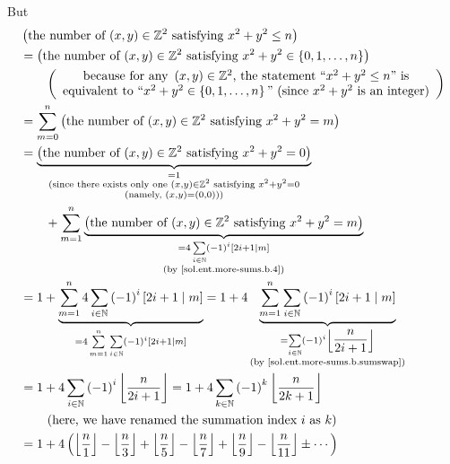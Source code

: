 \documentclass[paper=a4, fontsize=12pt]{scrartcl}%
\let\sumnonlimits\sum
\renewcommand{\sum}{\sumnonlimits\limits}
\theoremstyle{plainsl}
\theoremstyle{definition}
\theoremstyle{remark}
\begin{document}
But
\begin{align*}
&  \left(  \text{the number of $\left(  x,y\right)  \in\mathbb{Z}^{2}$
satisfying $x^{2}+y^{2}\leq n$}\right) \\
&  =\left(  \text{the number of $\left(  x,y\right)  \in\mathbb{Z}^{2}$
satisfying $x^{2}+y^{2}\in\left\{  0,1,\ldots,n\right\}  $}\right) \\
&  \qquad\left(
\begin{array}
[c]{c}%
\text{because for any }\left(  x,y\right)  \in\mathbb{Z}^{2}\text{, the
statement \textquotedblleft}x^{2}+y^{2}\leq n\text{\textquotedblright\ is}\\
\text{equivalent to \textquotedblleft}x^{2}+y^{2}\in\left\{  0,1,\ldots
,n\right\}  \text{\textquotedblright\ (since }x^{2}+y^{2}\text{ is an
integer)}%
\end{array}
\right) \\
&  =\sum_{m=0}^{n}\left(  \text{the number of $\left(  x,y\right)
\in\mathbb{Z}^{2}$ satisfying $x^{2}+y^{2}=m$}\right) \\
&  =\underbrace{\left(  \text{the number of $\left(  x,y\right)  \in
\mathbb{Z}^{2}$ satisfying $x^{2}+y^{2}=0$}\right)  }%
_{\substack{=1\\\text{(since there exists only one }\left(  x,y\right)
\in\mathbb{Z}^{2}\text{ satisfying }x^{2}+y^{2}=0\\\text{(namely, }\left(
x,y\right)  =\left(  0,0\right)  \text{))}}}\\
&  \qquad+\sum_{m=1}^{n}\underbrace{\left(  \text{the number of $\left(
x,y\right)  \in\mathbb{Z}^{2}$ satisfying $x^{2}+y^{2}=m$}\right)
}_{\substack{=4\sum_{i\in\mathbb{N}}\left(  -1\right)  ^{i}\left[  2i+1\mid
m\right]  \\\text{(by \eqref{sol.ent.more-sums.b.4})}}}\\
&  =1+\underbrace{\sum_{m=1}^{n}4\sum_{i\in\mathbb{N}}\left(  -1\right)
^{i}\left[  2i+1\mid m\right]  }_{=4\sum_{m=1}^{n}\sum_{i\in\mathbb{N}}\left(
-1\right)  ^{i}\left[  2i+1\mid m\right]  }=1+4\underbrace{\sum_{m=1}^{n}%
\sum_{i\in\mathbb{N}}\left(  -1\right)  ^{i}\left[  2i+1\mid m\right]
}_{\substack{=\sum_{i\in\mathbb{N}}\left(  -1\right)  ^{i}\left\lfloor
\dfrac{n}{2i+1}\right\rfloor \\\text{(by \eqref{sol.ent.more-sums.b.sumswap})}%
}}\\
&  =1+4\sum_{i\in\mathbb{N}}\left(  -1\right)  ^{i}\left\lfloor \dfrac
{n}{2i+1}\right\rfloor =1+4\sum_{k\in\mathbb{N}}\left(  -1\right)
^{k}\left\lfloor \dfrac{n}{2k+1}\right\rfloor \\
&  \qquad\left(  \text{here, we have renamed the summation index }i\text{ as
}k\right) \\
&  =1+4\left(  \left\lfloor \dfrac{n}{1}\right\rfloor -\left\lfloor \dfrac
{n}{3}\right\rfloor +\left\lfloor \dfrac{n}{5}\right\rfloor -\left\lfloor
\dfrac{n}{7}\right\rfloor +\left\lfloor \dfrac{n}{9}\right\rfloor
-\left\lfloor \dfrac{n}{11}\right\rfloor \pm\cdots\right)
\end{align*}
\end{document}
